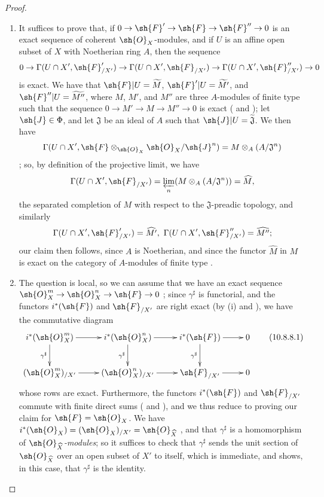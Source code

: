 \begin{proof}
\medskip\noindent
\begin{enumerate}
  \item[\rm{(i)}] It suffices to prove that, if $0\to\sh{F}'\to\sh{F}\to\sh{F}''\to 0$ is an exact sequence of coherent $\sh{O}_X$-modules, and if $U$ is an affine open subset of $X$ with Noetherian ring $A$, then the sequence
\[
  0\to\Gamma(U\cap X',\sh{F}_{/X'}')\to\Gamma(U\cap X',\sh{F}_{/X'})\to\Gamma(U\cap X',\sh{F}_{/X'}'')\to 0
\]
is exact.
We have that $\sh{F}|U=\widetilde{M}$, $\sh{F}'|U=\widetilde{M'}$, and $\sh{F}''|U=\widetilde{M''}$, where $M$, $M'$, and $M''$ are three $A$-modules of finite type such that the sequence $0\to M'\to M\to M''\to 0$ is exact ( and ); let $\sh{J}\in\Phi$, and let $\mathfrak{J}$ be an ideal of $A$ such that $\sh{J}|U=\widetilde{\mathfrak{J}}$.
We then have
\[
  \Gamma(U\cap X',\sh{F}\otimes_{\sh{O}_X}\sh{O}_X/\sh{J}^n)=M\otimes_A(A/\mathfrak{J}^n)
\]
; so, by definition of the projective limit, we have
\[
  \Gamma(U\cap X',\sh{F}_{/X'})=\varprojlim_n(M\otimes_A(A/\mathfrak{J}^n))=\widehat{M},
\]
the separated completion of $M$ with respect to the $\mathfrak{J}$-preadic topology, and similarly
\[
  \Gamma(U\cap X',\sh{F}_{/X'}')=\widehat{M'},\ \Gamma(U\cap X',\sh{F}_{/X'}'')=\widehat{M''};
\]
our claim then follows, since $A$ is Noetherian, and since the functor $\widehat{M}$ in $M$ is exact on the category of $A$-modules of finite type .
  \item[\rm{(ii)}] The question is local, so we can assume that we have an exact sequence $\sh{O}_X^m\to\sh{O}_X^n\to\sh{F}\to 0$ ; since $\gamma^\sharp$ is functorial, and the functors $i^*(\sh{F})$ and $\sh{F}_{/X'}$ are right exact (by (i) and ), we have the commutative diagram
\[
\label{I.10.8.8.1}
  \xymatrix{
    i^*(\sh{O}_X^m)\ar[r]\ar[d]_{\gamma^\sharp} &
    i^*(\sh{O}_X^n)\ar[r]\ar[d]_{\gamma^\sharp} &
    i^*(\sh{F})\ar[r]\ar[d]_{\gamma^\sharp} &
    0\\
    (\sh{O}_X^m)_{/X'}\ar[r] &
    (\sh{O}_X^n)_{/X'}\ar[r] &
    \sh{F}_{/X'}\ar[r] &
    0
  }
  \tag{10.8.8.1}
\]
whose rows are exact.
Furthermore, the functors $i^*(\sh{F})$ and $\sh{F}_{/X'}$ commute with finite direct sums ( and ), and we thus reduce to proving our claim for $\sh{F}=\sh{O}_X$.
We have $i^*(\sh{O}_X)=(\sh{O}_X)_{/X'}=\sh{O}_{\widehat{X}}$ , and that $\gamma^\sharp$ is a homomorphism of \emph{$\sh{O}_{\widehat{X}}$-modules}; so it suffices to check that $\gamma^\sharp$ sends the unit section of $\sh{O}_{\widehat{X}}$ over an open subset of $X'$ to itself, which is immediate, and shows, in this case, that $\gamma^\sharp$ is the identity.
\end{enumerate}
\end{proof}

